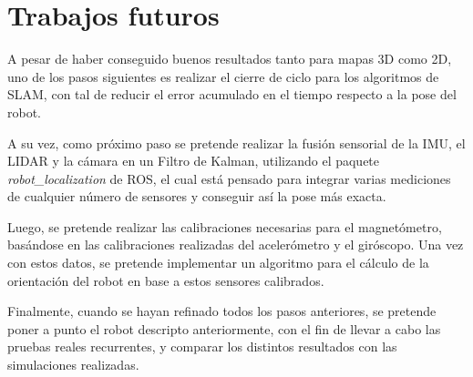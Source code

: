 \section{Trabajos futuros}
\label{sec:futureworks}
A pesar de haber conseguido buenos resultados tanto para mapas 3D como 2D, uno de los pasos siguientes es realizar el cierre de ciclo para los algoritmos de SLAM, con tal de reducir el error acumulado en el tiempo respecto a la pose del robot.

A su vez, como próximo paso se pretende realizar la fusión sensorial de la IMU, el LIDAR y la cámara en un Filtro de Kalman, utilizando el paquete \textit{robot\_localization} de ROS, el cual está pensado para integrar varias mediciones de cualquier número de sensores y conseguir así la pose más exacta.

Luego, se pretende realizar las calibraciones necesarias para el magnetómetro, basándose en las calibraciones realizadas del acelerómetro y el giróscopo. Una vez con estos datos, se pretende implementar un algoritmo para el cálculo de la orientación del robot en base a estos sensores calibrados.

Finalmente, cuando se hayan refinado todos los pasos anteriores, se pretende poner a punto el robot descripto anteriormente, con el fin de llevar a cabo las pruebas reales recurrentes, y comparar los distintos resultados con las simulaciones realizadas.
